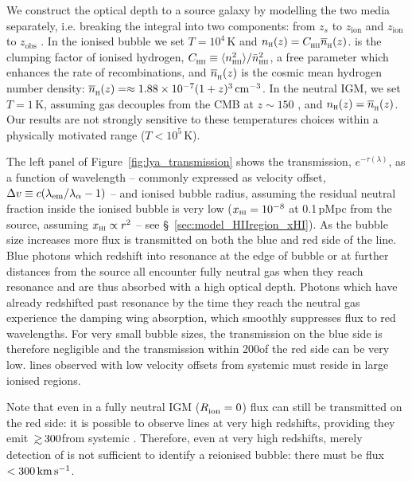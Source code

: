 \documentclass[fleqn,usenatbib]{mnras}
\begin{document}
We construct the optical depth to a source galaxy by modelling the two media separately, i.e. breaking the integral into two components: from $z_s$ to $z_\textrm{ion}$ and $z_\textrm{ion}$ to $z_\mathrm{obs}$ \citep[following,][]{Haiman2002,Cen2000,Mesinger2004}. In the ionised bubble we set $T=10^4$\,K \citep[appropriate for photoionised gas at the mean density, e.g.,][]{Hui1997} and $n_\textsc{h}(z) = \clump \nh(z)$. \clump is the clumping factor of ionised hydrogen, $\clump \equiv \langle n_\HII^2\rangle / \bar n_\HII^2$, a free parameter which enhances the rate of recombinations, and $\nh(z)$ is the cosmic mean hydrogen number density: $\nh(z) = \approx 1.88\times10^{-7} (1+z)^3\cm^{-3}$. In the neutral IGM, we set $T=1$\,K, assuming gas decouples from the CMB at $z\sim150$ \citep{Peebles1993}, and $n_\textsc{h}(z) = \nh(z)$. Our results are not strongly sensitive to these temperatures choices within a physically motivated range ($T<10^5$\,K).

The left panel of Figure~\ref{fig:lya_transmission} shows the \lya transmission, $e^{-\tau(\lambda)}$, as a function of wavelength -- commonly expressed as velocity offset, $\DV \equiv c (\lambda_\mathrm{em} / \lambda_\alpha - 1)$ -- and ionised bubble radius, assuming the residual neutral fraction inside the ionised bubble is very low ($\xHI = 10^{-8}$ at 0.1\,pMpc from the source, assuming $\xHI \propto r^2$ -- see \S~\ref{sec:model_HIIregion_xHI}). As the bubble size increases more flux is transmitted on both the blue and red side of the line. Blue photons which redshift into resonance at the edge of bubble or at further distances from the source all encounter fully neutral gas when they reach resonance and are thus absorbed with a high optical depth. Photons which have already redshifted past resonance by the time they reach the neutral gas experience the damping wing absorption, which smoothly suppresses flux to red wavelengths. For very small bubble sizes, the transmission on the blue side is therefore negligible and the transmission within 200\kms of the red side can be very low. \lya lines observed with low velocity offsets from systemic must reside in large ionised regions. 

Note that even in a fully neutral IGM ($\Rion = 0$) \lya flux can still be transmitted on the red side: it is possible to observe \lya lines at very high redshifts, providing they emit \lya $\simgt300$\kms from systemic \citep{Dijkstra2011}. Therefore, even at very high redshifts, merely detection of \lya is not sufficient to identify a reionised bubble: there must be flux $<300\kms$.
\end{document}
